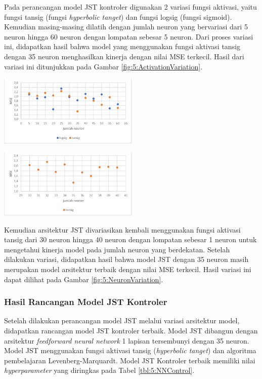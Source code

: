 \documentclass[a4paper,10pt]{article}
\makeatletter
\newenvironment{body}{\begin{multicols}{2}}{\end{multicols}}
\renewenvironment{figure}
{\def\@captype{figure}%
	\captionsetup{labelsep=period,format=hang,font=footnotesize,justification=justified}
}
{}
\makeatother
\begin{document}
\begin{body}
		Pada perancangan model JST kontroler digunakan 2 variasi fungsi aktivasi, yaitu fungsi tansig (fungsi \textit{hyperbolic tanget}) dan fungsi logsig (fungsi sigmoid). Kemudian masing-masing dilatih dengan jumlah neuron yang bervariasi dari 5 neuron hingga 60 neuron dengan lompatan sebesar 5 neuron. Dari proses variasi ini, didapatkan hasil bahwa model yang menggunakan fungsi aktivasi tansig dengan 35 neuron menghasilkan kinerja dengan nilai MSE terkecil. Hasil dari variasi ini ditunjukkan pada Gambar \ref{fig:5:ActivationVariation}.
		
		\begin{figure}
			\centering
			\includegraphics[width=0.5\textwidth]{figures/ActivationVariation}
			\caption{Grafik Persebaran MSE Variasi Arsitektur JST Kontroler}
			\label{fig:5:ActivationVariation}
		\end{figure}
		
		\begin{figure}
			\centering
			\includegraphics[width=0.5\textwidth]{figures/NeuronVariation}
			\caption{Grafik Persebaran MSE Variasi Arsitektur JST Kontroler}
			\label{fig:5:NeuronVariation}
		\end{figure}
		\vspace{1em}
		
		Kemudian arsitektur JST divariasikan kembali menggunakan fungsi aktivasi tansig dari 30 neuron hingga 40 neuron dengan lompatan sebesar 1 neuron untuk mengetahui kinerja model pada jumlah neuron yang berdekatan. Setelah dilakukan variasi, didapatkan hasil bahwa model JST dengan 35 neuron masih merupakan model arsitektur terbaik dengan nilai MSE terkecil. Hasil variasi ini dapat dilihat pada Gambar \ref{fig:5:NeuronVariation}.
		
		\subsubsection{Hasil Rancangan Model JST Kontroler}
		Setelah dilakukan perancangan model JST melalui variasi arsitektur model, didapatkan rancangan model JST kontroler terbaik. Model JST dibangun dengan arsitektur \textit{feedforward neural network} 1 lapisan tersembunyi dengan 35 neuron. Model JST menggunakan fungsi aktivasi tansig (\textit{hyperbolic tanget}) dan algoritma pembelajaran Levenberg-Marquardt. Model JST Kontroler terbaik memiliki nilai \textit{hyperparameter} yang diringkas pada Tabel \ref{tbl:5:NNControl}.
		

\end{body}
\end{document}

